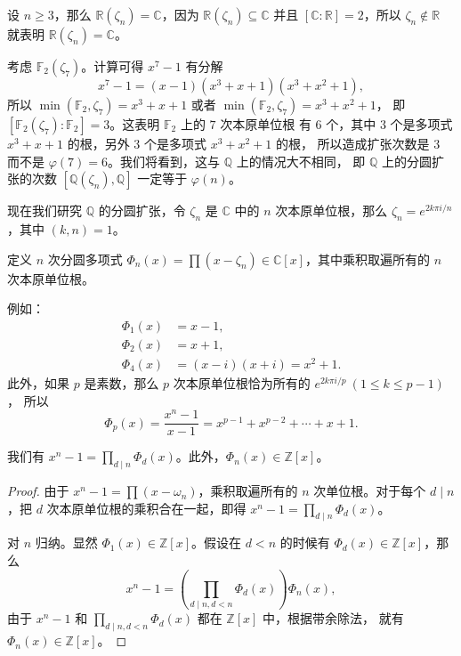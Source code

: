 \begin{example}
  设 $n\geq 3$，那么 $\mathbb{R}(\zeta_n)=\mathbb{C}$，因为 $\mathbb{R}(\zeta_n)\subseteq \mathbb{C}$ 并且
  $[\mathbb{C}:\mathbb{R}]=2$，所以 $\zeta_n\notin \mathbb{R}$ 就表明 $\mathbb{R}(\zeta_n)=\mathbb{C}$。
\end{example}

\begin{example}
  考虑 $\mathbb{F}_2(\zeta_7)$。计算可得 $x^7-1$ 有分解
  \[
    x^7-1=(x-1)(x^3+x+1)(x^3+x^2+1),
  \]
  所以 $\min(\mathbb{F}_2,\zeta_7)=x^3+x+1$ 或者 $\min(\mathbb{F}_2,\zeta_7)=x^3+x^2+1$，
  即 $[\mathbb{F}_2(\zeta_7):\mathbb{F}_2]=3$。这表明 $\mathbb{F}_2$ 上的 $7$ 次本原单位根
  有 $6$ 个，其中 $3$ 个是多项式 $x^3+x+1$ 的根，另外 $3$ 个是多项式 $x^3+x^2+1$ 的根，
  所以造成扩张次数是 $3$ 而不是 $\varphi(7)=6$。我们将看到，这与 $\mathbb{Q}$ 上的情况大不相同，
  即 $\mathbb{Q}$ 上的分圆扩张的次数 $[\mathbb{Q}(\zeta_n),\mathbb{Q}]$ 一定等于 $\varphi(n)$。
\end{example}

现在我们研究 $\mathbb{Q}$ 的分圆扩张，令 $\zeta_n$ 是 $\mathbb{C}$
中的 $n$ 次本原单位根，那么 $\zeta_{n}=e^{2k\pi i/n}$，其中 $(k,n)=1$。

\begin{definition}
  定义 $n$ 次分圆多项式 $\Phi_n(x)=\prod (x-\zeta_n)\in \mathbb{C}[x]$，其中乘积取遍所有的 $n$ 次本原单位根。
\end{definition}

例如：
\begin{align*}
  \Phi_1(x)&=x-1,\\
  \Phi_2(x)&=x+1,\\
  \Phi_4(x)&=(x-i)(x+i)=x^2+1.
\end{align*}
此外，如果 $p$ 是素数，那么 $p$ 次本原单位根恰为所有的 $e^{2k\pi i/p}\ (1\leq k\leq p-1)$，
所以
\[
  \Phi_p(x)=\frac{x^n-1}{x-1}=x^{p-1}+x^{p-2}+\cdots+x+1.
\]

\begin{lemma}
  我们有 $x^n-1=\prod_{d\mid n}\Phi_d(x)$。此外，$\Phi_n(x)\in \mathbb{Z}[x]$。
\end{lemma}
\begin{proof}
  由于 $x^n-1=\prod (x-\omega_n)$，乘积取遍所有的 $n$ 次单位根。对于每个 $d\mid n$，把 $d$
  次本原单位根的乘积合在一起，即得 $x^n-1=\prod_{d\mid n}\Phi_d(x)$。
  
  对 $n$ 归纳。显然 $\Phi_1(x)\in \mathbb{Z}[x]$。假设在 $d<n$ 的时候有 $\Phi_d(x)\in \mathbb{Z}[x]$，那么
  \[
    x^n-1=\left(\prod_{d\mid n,d<n}\Phi_d(x)\right)\Phi_n(x),
  \]
  由于 $x^n-1$ 和 $\prod_{d\mid n,d<n}\Phi_d(x)$ 都在 $\mathbb{Z}[x]$ 中，根据带余除法，
  就有 $\Phi_n(x)\in \mathbb{Z}[x]$。
\end{proof}

